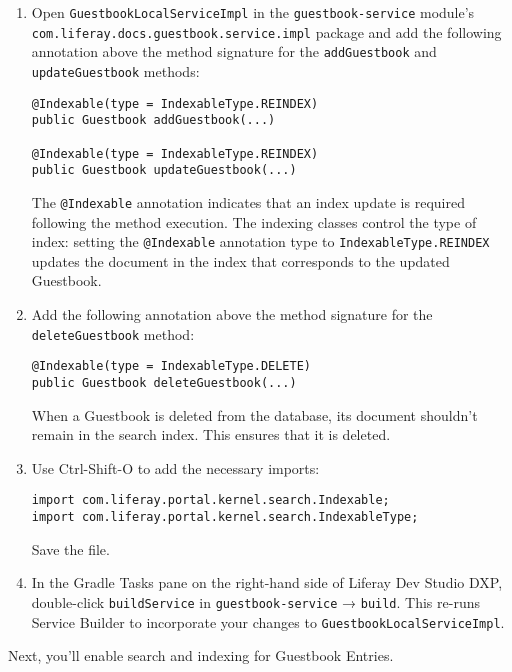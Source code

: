 \begin{enumerate}
\def\labelenumi{\arabic{enumi}.}
\item
  Open \texttt{GuestbookLocalServiceImpl} in the
  \texttt{guestbook-service} module's
  \texttt{com.liferay.docs.guestbook.service.impl} package and add the
  following annotation above the method signature for the
  \texttt{addGuestbook} and \texttt{updateGuestbook} methods:

\begin{verbatim}
@Indexable(type = IndexableType.REINDEX)
public Guestbook addGuestbook(...)

@Indexable(type = IndexableType.REINDEX)
public Guestbook updateGuestbook(...)
\end{verbatim}

  The \texttt{@Indexable} annotation indicates that an index update is
  required following the method execution. The indexing classes control
  the type of index: setting the \texttt{@Indexable} annotation type to
  \texttt{IndexableType.REINDEX} updates the document in the index that
  corresponds to the updated Guestbook.
\item
  Add the following annotation above the method signature for the
  \texttt{deleteGuestbook} method:

\begin{verbatim}
@Indexable(type = IndexableType.DELETE)
public Guestbook deleteGuestbook(...)
\end{verbatim}

  When a Guestbook is deleted from the database, its document shouldn't
  remain in the search index. This ensures that it is deleted.
\item
  Use Ctrl-Shift-O to add the necessary imports:

\begin{verbatim}
import com.liferay.portal.kernel.search.Indexable;
import com.liferay.portal.kernel.search.IndexableType;
\end{verbatim}

  Save the file.
\item
  In the Gradle Tasks pane on the right-hand side of Liferay Dev Studio
  DXP, double-click \texttt{buildService} in \texttt{guestbook-service}
  → \texttt{build}. This re-runs Service Builder to incorporate your
  changes to \texttt{GuestbookLocalServiceImpl}.
\end{enumerate}

Next, you'll enable search and indexing for Guestbook Entries.


